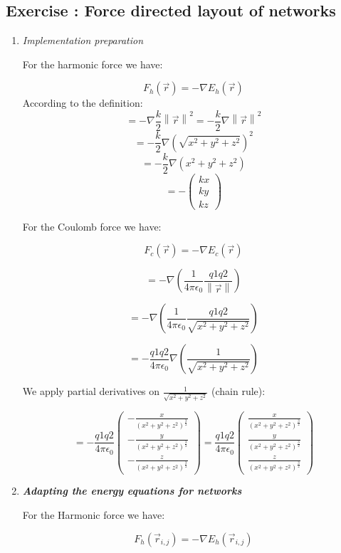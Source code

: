 \documentclass[10pt,a4paper]{article}
\newcommand{\norm}[1]{\left\lVert#1\right\rVert}
\newcommand{\exercise}[1]
{
  \stepcounter{subsection}
  \subsection*{Exercise \thesubsection: #1}

}
\begin{document}
\newpage
\exercise{Force directed layout of networks}
\begin{enumerate}
	
	\item \textit{Implementation preparation}
	
	For the harmonic force we have: 
	
	
\[ F_{h}(\vec{r}) = -\nabla E_{h}(\vec{r})\]
According to the definition: 
\[ = -\nabla \frac{k}{2} \norm{\vec{r}}^2 = -\frac{k}{2} \nabla \norm{\vec{r}}^2 \]
\[ = -\frac{k}{2}\nabla  (\sqrt{x^2 + y^2 + z^2})^2  \]
\[ = -\frac{k}{2}\nabla  (x^2 + y^2 + z^2)  \]
\[ = -\begin{pmatrix}
kx\\
ky\\
kz
	\end{pmatrix} \]


	For the Coulomb force we have: 
	
	\[ F_{c}(\vec{r}) = -\nabla E_{c}(\vec{r})\]

	\[ = -\nabla(\frac{1}{4\pi\epsilon_{0}} \frac{q1 q2}{\norm{\vec{r}}}) \]
	
	\[ = -\nabla(\frac{1}{4\pi\epsilon_{0}} \frac{q1 q2}{\sqrt{x^2 + y^2 + z^2}}) \]
	
	\[ = - \frac{q1 q2}{4\pi\epsilon_{0}} \nabla ( \frac{1}{\sqrt{x^2 + y^2 + z^2}}) \]
	
	We apply partial derivatives on $ \frac{1}{\sqrt{x^2 + y^2 + z^2}}$ (chain rule): 
	
	\[ = - \frac{q1 q2}{4\pi\epsilon_{0}} \begin{pmatrix}
	-\frac{x}{(x^2 + y^2 + z^2)^{\frac{3}{2}}}\\
	-\frac{y}{(x^2 + y^2 + z^2)^{\frac{3}{2}}}\\
	-\frac{z}{(x^2 + y^2 + z^2)^{\frac{3}{2}}}
	\end{pmatrix} = \frac{q1 q2}{4\pi\epsilon_{0}} \begin{pmatrix}
	\frac{x}{(x^2 + y^2 + z^2)^{\frac{3}{2}}}\\
	\frac{y}{(x^2 + y^2 + z^2)^{\frac{3}{2}}}\\
	\frac{z}{(x^2 + y^2 + z^2)^{\frac{3}{2}}}
	\end{pmatrix} \]
	
	
	
	\item \textit{\textbf{Adapting the energy equations for networks}}
	
	For the Harmonic force we have: 
	
	\[ F_{h}(\vec{r}_{i,j}) = -\nabla E_{h}(\vec{r}_{i,j})  \]
	

\end{enumerate}
\end{document}
